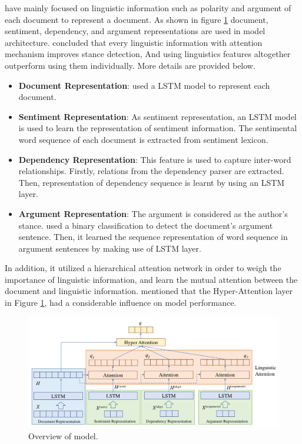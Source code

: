 \cite{Hierarchical-Attention-Network} have mainly focused on linguistic information such as polarity and argument of each document to represent a document. As shown in figure \ref{fig:hierarchical_att} document, sentiment, dependency, and argument representations are used in model architecture. \cite{Hierarchical-Attention-Network} concluded that every linguistic information with attention mechanism improves stance detection, And using linguistics features altogether outperform using them individually. More details are provided below.

\begin{itemize}
	\item \textbf{Document Representation}: \cite{Hierarchical-Attention-Network} used a LSTM model to represent each document.
	\item \textbf{Sentiment Representation}: As sentiment representation, an LSTM model is used to learn the representation of sentiment information. The sentimental word sequence of each document is extracted from sentiment lexicon. 
	\item \textbf{Dependency Representation}: This feature is used to capture inter-word relationships. Firstly, relations from the dependency parser are extracted. Then, representation of dependency sequence is learnt by using an LSTM layer.
	\item \textbf{Argument Representation}: The argument is considered as the author's stance. \cite{Hierarchical-Attention-Network} used a binary classification to detect the document's argument sentence. Then, it learned the sequence representation of word sequence in argument sentences by making use of LSTM layer.
\end{itemize}

In addition, it utilized a hierarchical attention network in order to weigh the importance of linguistic information, and learn the mutual attention between the document and linguistic information. \cite{Hierarchical-Attention-Network} mentioned that the Hyper-Attention layer in Figure \ref{fig:hierarchical_att}, had a considerable influence on model performance. 

\begin{figure}
	\centering
	\includegraphics[scale=0.4]{statistics/stance/hierarchial-attention-network.png}
	\caption{Overview of \cite{Hierarchical-Attention-Network} model.}
	\label{fig:hierarchical_att}
\end{figure}

